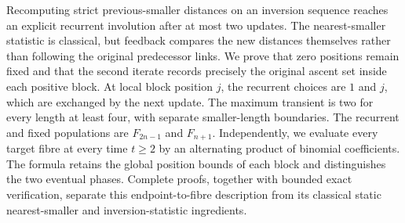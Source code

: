 Recomputing strict previous-smaller distances on an inversion sequence
reaches an explicit recurrent involution after at most two updates.
The nearest-smaller statistic is classical, but feedback compares the
new distances themselves rather than following the original predecessor
links. We prove that zero positions remain fixed and that the second
iterate records precisely the original ascent set inside each positive
block. At local block position $j$, the recurrent choices are $1$ and $j$,
which are exchanged by the next update. The maximum transient is two
for every length at least four, with separate smaller-length boundaries.
The recurrent and fixed populations are $F_{2n-1}$ and $F_{n+1}$.
Independently, we evaluate every target fibre at every time $t\ge2$ by
an alternating product of binomial coefficients. The formula retains
the global position bounds of each block and distinguishes the two
eventual phases. Complete proofs, together with bounded exact verification,
separate this endpoint-to-fibre description from its classical static
nearest-smaller and inversion-statistic ingredients.
